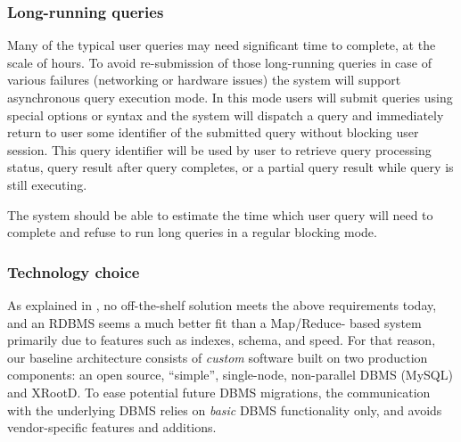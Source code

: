 \documentclass[DM,lsstdraft,toc]{lsstdoc}
\begin{document}
\subsubsection{Long-running queries}\label{long-running-queries}

Many of the typical user queries may need significant time to complete,
at the scale of hours. To avoid re-submission of those long-running
queries in case of various failures (networking or hardware issues) the
system will support asynchronous query execution mode. In this mode
users will submit queries using special options or syntax and the system
will dispatch a query and immediately return to user some identifier of
the submitted query without blocking user session. This query identifier
will be used by user to retrieve query processing status, query result
after query completes, or a partial query result while query is still
executing.

The system should be able to estimate the time which user query will
need to complete and refuse to run long queries in a regular blocking
mode.

\subsubsection{Technology choice}\label{technology-choice}

As explained in , no off-the-shelf solution meets the above
requirements today, and an RDBMS seems a much better fit than a Map/Reduce-
based system primarily due to features such as indexes, schema, and speed. For
that reason, our baseline architecture consists of \emph{custom} software
built on two production components: an open source, ``simple'', single-node,
non-parallel DBMS (MySQL) and XRootD. To ease potential future DBMS
migrations, the communication with the underlying DBMS relies on \emph{basic}
DBMS functionality only, and avoids vendor-specific features and additions.
\end{document}
